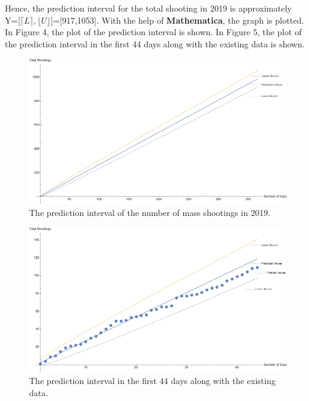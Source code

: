\documentclass[a4paper]{article}
\begin{document}
{{\par{Hence, the prediction interval for the total shooting in 2019 is approximately \\ Y=[$\lceil L \rceil,\lfloor U \rfloor$]=[917,1053]. With the help of \textbf{Mathematica}, the graph is plotted. In Figure 4, the plot of the prediction interval is shown. In Figure 5, the plot of the prediction interval in the first 44 days along with the existing data is shown.}
\begin{figure}[H]
    \centering
    \includegraphics[width = 15cm]{figure7-1}
    \caption{The prediction interval of the number of mass shootings in 2019.}
    \label{f1}
\end{figure}
\begin{figure}[H]
    \centering
    \includegraphics[width = 15cm]{figure7-2}
    \caption{The prediction interval in the first 44 days along with the existing data.}
    \label{f1}
\end{figure}

\newpage

}}
\end{document}
